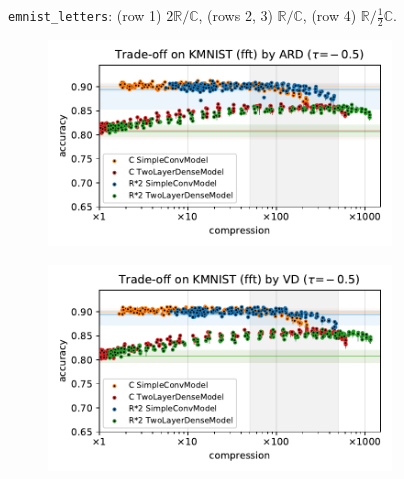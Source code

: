 \documentclass[a4paper,10pt,onecolumn]{article}
\newcommand{\real}{\mathbb{R}}
\newcommand{\cplx}{\mathbb{C}}
\begin{document}
\begin{figure}[b]
\begin{subfigure}[b]{0.5\columnwidth}
  \end{subfigure}
  \caption{%
    \texttt{emnist\_letters}: (row 1) $2\real / \cplx$, (rows 2, 3) $\real / \cplx$, (row 4) $\real / \tfrac12\cplx$.
  }
\end{figure}

\begin{figure}[b]
  \centering
  \begin{subfigure}[b]{0.5\columnwidth}
    \centering
    \includegraphics[width=\columnwidth]{figure__mnist-like__trade-off/appendix__cmp__ARD__kmnist__fft__-0.5.pdf}
  \end{subfigure}%
  \begin{subfigure}[b]{0.5\columnwidth}
    \centering
    \includegraphics[width=\columnwidth]{figure__mnist-like__trade-off/appendix__cmp__VD__kmnist__fft__-0.5.pdf}
  \end{subfigure} \\ %
  \begin{subfigure}[b]{0.5\columnwidth}

\end{subfigure}
\end{figure}
\end{document}
